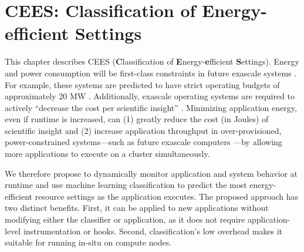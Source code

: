 \chapter{CEES: Classification of Energy-efficient Settings}

This chapter describes CEES (\textbf{C}lassification of \textbf{E}nergy-\textbf{e}fficient \textbf{S}ettings).
Energy and power consumption will be first-class constraints in future exascale systems \cite{exaosr-power}.
For example, these systems are predicted to have strict operating budgets of approximately 20 MW \cite{Exascale20MW}.
Additionally, exascale operating systems are required to actively ``decrease the cost per scientific insight'' \cite{DOEML}.  
Minimizing application energy, even if runtime is increased, can (1) greatly reduce the cost (in Joules) of scientific insight and (2) increase application throughput in over-provisioned, power-constrained systems---such as future exascale computers \cite{Sarood2013,PatkiRMAP}---by allowing more applications to execute on a cluster simultaneously.

We therefore propose to dynamically monitor application and system behavior at runtime and use machine learning classification to predict the most energy-efficient resource settings as the application executes.
The proposed approach has two distinct benefits.
First, it can be applied to new applications without modifying either the classifier or application, as it does not require application-level instrumentation or hooks.
Second, classification's low overhead makes it suitable for running in-situ on compute nodes.






